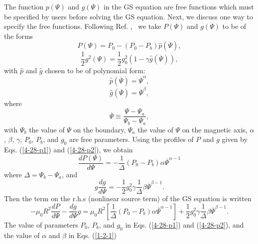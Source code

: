 \documentclass{llncs}
\begin{document}
The function $p (\Psi)$ and $g (\Psi)$ in the GS equation are free functions
which must be specified by users before solving the GS equation. Next, we
discuss one way to specify the free functions. Following Ref.
{\cite{jardin2010}}, \ we take $P (\Psi)$ and $g (\Psi)$ to be of the forms
\begin{equation}
  \label{4-28-p1} P (\Psi) = P_0 - (P_0 - P_b) \hat{p} (\overline{\Psi}),
\end{equation}
\begin{equation}
  \label{4-28-p2} \frac{1}{2} g^2 (\Psi) = \frac{1}{2} g_0^2 (1 - \gamma
  \hat{g} (\overline{\Psi})),
\end{equation}
with $\hat{p}$ and $\hat{g}$ chosen to be of polynomial form:
\begin{equation}
  \label{1-2-1} \hat{p} (\overline{\Psi}) = \overline{\Psi}^{\alpha},
\end{equation}
\begin{equation}
  \label{1-2-2} \hat{g} (\overline{\Psi}) = \overline{\Psi}^{\beta},
\end{equation}
where
\begin{equation}
  \overline{\Psi} \equiv \frac{\Psi - \Psi_a}{\Psi_b - \Psi_a},
\end{equation}
with $\Psi_b$ the value of $\Psi$ on the boundary, $\Psi_a$ the value of
$\Psi$ on the magnetic axis, $\alpha$, $\beta$, $\gamma$, $P_0$, $P_b$, and
$g_0$ are free parameters. Using the profiles of $P$ and $g$ given by Eqs.
(\ref{4-28-p1}) and (\ref{4-28-p2}), we obtain
\begin{equation}
  \frac{d P (\Psi)}{d \Psi} = - \frac{1}{\Delta} (P_0 - P_b) \alpha
  \overline{\Psi}^{\alpha - 1}
\end{equation}
where $\Delta = \Psi_b - \Psi_a$, and
\begin{equation}
  g \frac{d g}{d \Psi} = - \frac{1}{2} g_0^2 \gamma \frac{1}{\Delta} \beta
  \overline{\Psi}^{\beta - 1} .
\end{equation}
Then the term on the r.h.s (nonlinear source term) of the GS equation is
written
\begin{equation}
  - \mu_0 R^2 \frac{d P}{d \Psi} - \frac{d g}{d \Psi} g = \mu_0 R^2 \left[
  \frac{1}{\Delta} (P_0 - P_b) \alpha \overline{\Psi}^{\alpha - 1} \right] +
  \frac{1}{2} g_0^2 \gamma \frac{1}{\Delta} \beta \overline{\Psi}^{\beta - 1}
  .
\end{equation}
The value of parameters $P_0$, $P_b$, and $g_0$ in Eqs. (\ref{4-28-p1}) and
(\ref{4-28-p2}), and the value of $\alpha$ and $\beta$ in Eqs. (\ref{1-2-1})
\end{document}
